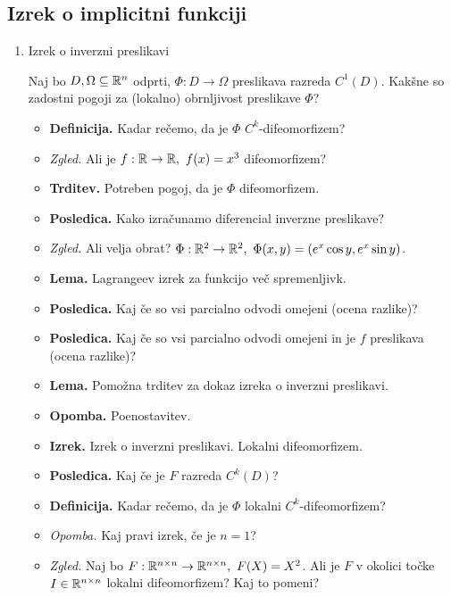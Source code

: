\newpage
\subsection{Izrek o implicitni funkciji}
\begin{enumerate}
    \item Izrek o inverzni preslikavi
    
    Naj bo $D, \Omega \subseteq \mathbb{R}^n$ odprti, $\Phi: D \to \Omega$ preslikava razreda $C^1(D)$. Kakšne so zadostni pogoji za (lokalno) obrnljivost preslikave $\Phi$?
    
    \begin{itemize}
        \item \colorbox{purple!30}{\textbf{Definicija.}} Kadar rečemo, da je $\Phi$ $C^k$-difeomorfizem?
        \item \colorbox{yellow!30}{\emph{Zgled.}} Ali je $f: \mathbb{R} \to \mathbb{R}, \ f(x) = x^3$ difeomorfizem?        
        \item \colorbox{blue!30}{\textbf{Trditev.}} Potreben pogoj, da je $\Phi$ difeomorfizem.
        \item \colorbox{blue!30}{\textbf{Posledica.}} Kako izračunamo diferencial inverzne preslikave?

        \item \colorbox{yellow!30}{\emph{Zgled.}} Ali velja obrat? $\Phi: \R^2 \to \R^2, \ \Phi(x,y) = (e^x \cos y, e^x \sin y)$.
        \item \colorbox{blue!30}{\textbf{Lema.}} Lagrangeev izrek za funkcijo več spremenljivk.
        \item \colorbox{orange!30}{\textbf{Posledica.}} Kaj če so vsi parcialno odvodi omejeni (ocena razlike)?
        \item \colorbox{orange!30}{\textbf{Posledica.}} Kaj če so vsi parcialno odvodi omejeni in je \(f\) preslikava (ocena razlike)?
        \item \colorbox{blue!30}{\textbf{Lema.}} Pomožna trditev za dokaz izreka o inverzni preslikavi.
        \item \textbf{Opomba.} Poenostavitev.
        \item \colorbox{blue!30}{\textbf{Izrek.}} Izrek o inverzni preslikavi. Lokalni difeomorfizem.
        \item \colorbox{orange!30}{\textbf{Posledica.}} Kaj če je $F$ razreda $C^k(D)$?
        \item \colorbox{purple!30}{\textbf{Definicija.}} Kadar rečemo, da je $\Phi$ lokalni $C^k$-difeomorfizem?
        \item \colorbox{yellow!30}{\emph{Opomba.}} Kaj pravi izrek, če je $n = 1$?
        \item \colorbox{yellow!30}{\emph{Zgled.}}  Naj bo $F: \mathbb{R}^{n \times n} \to \mathbb{R}^{n \times n}, \ F(X) = X^2$. Ali je $F$ v okolici točke $I \in \mathbb{R}^{n \times n}$ lokalni difeomorfizem? Kaj to pomeni?
    \end{itemize}
    


\end{enumerate}
